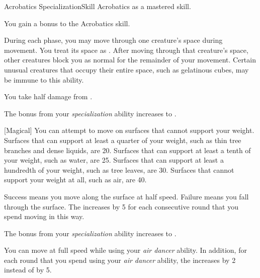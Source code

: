    \begin{feat}{Acrobatics Specialization}{Skill}
        \featpre Acrobatics as a mastered skill.

         You gain a  bonus to the Acrobatics skill.

         During each phase, you may move through one creature's space during movement.
        You treat its space as .
        After moving through that creature's space, other creatures block you as normal for the remainder of your movement.
        Certain unusual creatures that occupy their entire space, such as gelatinous cubes, may be immune to this ability.

         You take half damage from .

         The bonus from your \textit{specialization} ability increases to .

        [Magical] You can attempt to move on surfaces that cannot support your weight.
        Surfaces that can support at least a quarter of your weight, such as thin tree branches and dense liquids, are  20.
        Surfaces that can support at least a tenth of your weight, such as water, are  25.
        Surfaces that can support at least a hundredth of your weight, such as tree leaves, are  30.
        Surfaces that cannot support your weight at all, such as air, are  40.

        Success means you move along the surface at half speed.
        Failure means you fall through the surface.
        The  increases by 5 for each consecutive round that you spend moving in this way.

         The bonus from your \textit{specialization} ability increases to .

         You can move at full speed while using your \textit{air dancer} ability.
        In addition, for each round that you spend using your \textit{air dancer} ability, the  increases by 2 instead of by 5.
    \end{feat}

